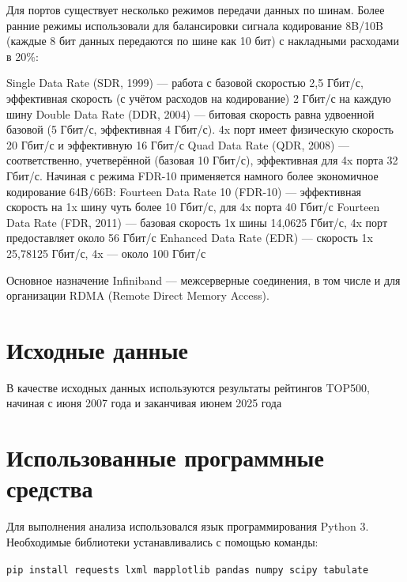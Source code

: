 \documentclass[14pt,a4paper]{extarticle}
\begin{document}
Для портов существует несколько режимов передачи данных по шинам. Более ранние
режимы использовали для балансировки сигнала кодирование 8B/10B (каждые 8
бит данных передаются по шине как 10 бит) с накладными расходами в 20\%:

Single Data Rate (SDR, 1999) — работа с базовой скоростью 2,5 Гбит/с,
эффективная скорость (с учётом расходов на кодирование) 2 Гбит/с на каждую шину
\newline
\indent Double Data Rate (DDR, 2004) — битовая скорость равна удвоенной базовой (5
Гбит/с, эффективная 4 Гбит/с). 4x порт имеет физическую скорость 20 Гбит/с и
эффективную 16 Гбит/с
\newline
\indent Quad Data Rate (QDR, 2008) — соответственно, учетверённой
(базовая 10 Гбит/с), эффективная для 4x порта 32 Гбит/с.
\newline
\indent
Начиная с режима FDR-10 применяется намного более экономичное кодирование
64B/66B:
\newline
\indent Fourteen Data Rate 10 (FDR-10) — эффективная скорость на 1x шину чуть более 10
Гбит/с, для 4x порта 40 Гбит/с
\newline
\indent Fourteen Data Rate (FDR, 2011) — базовая
скорость 1х шины 14,0625 Гбит/с, 4x порт предоставляет около 56 Гбит/с
\newline
\indent Enhanced Data Rate (EDR) — скорость 1x 25,78125 Гбит/с, 4x — около 100 Гбит/с

\vspace{5mm}
Основное назначение Infiniband — межсерверные соединения, в том числе и для
организации RDMA (Remote Direct Memory Access).
\newpage
\section{Исходные данные}

В качестве исходных данных используются результаты
рейтингов TOP500, начиная с июня 2007 года и
заканчивая июнем 2025 года

\section{Использованные программные средства}
Для выполнения анализа использовался язык программирования Python 3.
Необходимые библиотеки устанавливались с помощью команды:

\begin{sloppypar}
\texttt {pip install requests lxml mapplotlib pandas numpy scipy tabulate}
\end{sloppypar}
\end{document}
